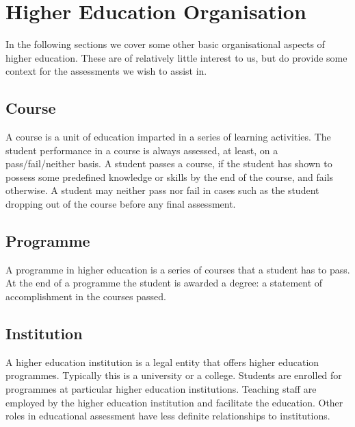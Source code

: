 
\section{Higher Education Organisation}

In the following sections we cover some other basic organisational aspects of
higher education. These are of relatively little interest to us, but do provide
some context for the assessments we wish to assist in.

\subsection{Course}

A course is a unit of education imparted in a series of learning activities.
The student performance in a course is always assessed, at least, on a
pass/fail/neither basis. A student passes a course, if the student has shown to
possess some predefined knowledge or skills by the end of the course, and fails
otherwise.  A student may neither pass nor fail in cases such as the student
dropping out of the course before any final assessment.

\subsection{Programme}

A programme in higher education is a series of courses that a student has to
pass. At the end of a programme the student is awarded a degree: a statement of
accomplishment in the courses passed.

\subsection{Institution}

A higher education institution is a legal entity that offers higher education
programmes. Typically this is a university or a college. Students are enrolled
for programmes at particular higher education institutions. Teaching staff are
employed by the higher education institution and facilitate the education.
Other roles in educational assessment have less definite relationships to
institutions.
